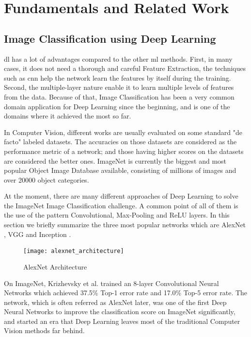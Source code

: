 \chapter{Fundamentals and Related Work\label{cha:relatedwork}}

\section{Image Classification using Deep Learning}

\acrfull{dl} has a lot of advantages compared to the other \acrshort{ml} methods. First,
in many cases, it does not need a thorough and careful Feature Extraction, the techniques
such as \acrshort{cnn} help the network learn the features by itself during the training.
Second, the multiple-layer nature enable it to learn multiple levels of features from the
data. Because of that, Image Classification has been a very common domain application for
Deep Learning since the beginning, and is one of the domains where it achieved the most so
far. 

In Computer Vision, different works are usually evaluated on some standard "de facto"
labeled datasets. The accuracies on those datasets are considered as the performance
metric of a network; and those having higher scores on the datasets are considered the
better ones. ImageNet \cite{imagenet} is currently the biggest and most popular Object
Image Database available, consisting of millions of images and over 20000 object
categories. 

At the moment, there are many different approaches of Deep Learning to solve the ImageNet
Image Classification challenge. A common point of all of them is the use of the pattern
Convolutional, Max-Pooling and ReLU layers. In this section we briefly summarize the three
most popular networks which are AlexNet \cite{alexnet}, VGG \cite{vgg} and Inception
\cite{inception1, inception2, inception3}.

\begin{figure}[h]
  \centering
  \texttt{[image: alexnet\_architecture]}
  \caption{AlexNet Architecture \cite{alexnet}}
  \label{fig:alexnet}
\end{figure}

On ImageNet, Krizhevsky et al. \cite{alexnet} trained an 8-layer Convolutional Neural
Networks which achieved 37.5\% Top-1 error rate and 17.0\% Top-5 error rate. The network,
which is often referred as AlexNet later, was one of the first Deep Neural Networks to
improve the classification score on ImageNet significantly, and started an era that Deep
Learning leaves most of the traditional Computer Vision methods far behind. 

